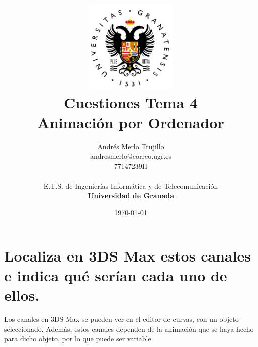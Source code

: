 \documentclass{article}
\title{
\includegraphics[width=1.75in]{imagenes/UGR-Logo.png} \\
\vspace*{1in}
\textbf{Cuestiones Tema 4} \\
Animación por Ordenador \\
\vspace*{0.5in}}
\author{Andrés Merlo Trujillo \\
andresmerlo@correo.ugr.es \\
77147239H \\ 
\vspace*{0.5in} \\
E.T.S. de Ingenierías Informática y de Telecomunicación \\
\textbf{Universidad de Granada}} \date{\today}
\begin{document}
\begin{titlingpage}
\maketitle
\end{titlingpage}

\tableofcontents

\newpage

\pagestyle{fancy}   %



\section{Localiza en 3DS Max estos canales e indica qué serían cada uno de ellos.}

Los canales en 3DS Max se pueden ver en el editor de curvas, con un objeto seleccionado. Además, estos canales dependen de la animación que se haya hecho para dicho objeto, por lo que puede ser variable. 
\end{document}
